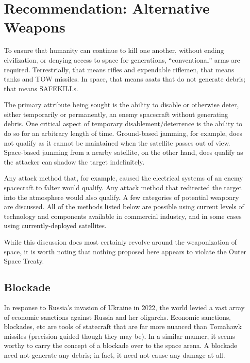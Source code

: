 \section{Recommendation: Alternative Weapons}

To ensure that humanity can continue to kill one another, without
ending civilization, or denying access to space for generations,
``conventional'' arms are required.  Terrestrially, that means rifles
and expendable riflemen, that means tanks and TOW missiles.  In space,
that means \acp{asat} that do not generate debris; that means
SAFEKILLs.

The primary attribute being sought is the ability to disable or
otherwise deter, either temporarily or permanently, an enemy
spacecraft without generating debris.  One critical aspect of
temporary disablement/deterrence is the ability to do so for an
arbitrary length of time.  Ground-based jamming, for example, does not
qualify as it cannot be maintained when the satellite passes out of
view.  Space-based jamming from a nearby satellite, on the other hand,
does qualify as the attacker can shadow the target indefinitely.

Any attack method that, for example, caused the electrical systems of
an enemy spacecraft to falter would qualify.  Any attack method that
redirected the target into the atmosphere would also qualify.  A few
categories of potential weaponry are discussed.  All of the methods
listed below are possible using current levels of technology and
components available in commercial industry, and in some cases using
currently-deployed satellites.

While this discussion does most certainly revolve around the
weaponization of space, it is worth noting that nothing proposed here
appears to violate the Outer Space Treaty.\cite{outer-space}

\subsection{Blockade}
In response to Russia's invasion of Ukraine in 2022, the world levied
a vast array of economic sanctions against Russia and her
oligarchs.\cite[nytimes article or something summarizing
  sanctions]{xxx} Economic sanctions, blockades, etc are tools of
statecraft that are far more nuanced than Tomahawk missiles
(precision-guided though they may be).  In a similar manner, it seems
worthy to carry the concept of a blockade over to the space arena.  A
blockade need not generate any debris; in fact, it need not cause any
damage at all.

